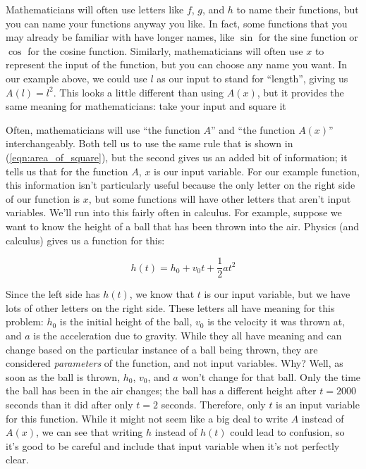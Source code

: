 Mathematicians will often use letters like $f$, $g$, and $h$ to name their functions, but you can name your functions anyway you like. In fact, some functions that you may already be familiar with have longer names, like $\sin$ for the sine function or $\cos$ for the cosine function. Similarly, mathematicians will often use $x$ to represent the input of the function, but you can choose any name you want. In our example above, we could use $l$ as our input to stand for ``length'', giving us $A(l) = l^2$. This looks a little different than using $A(x)$, but it provides the same meaning for mathematicians: take your input and square it

Often, mathematicians will use ``the function $A$'' and ``the function $A(x)$'' interchangeably. Both tell us to use the same rule that is shown in (\ref{eqn:area_of_square}), but the second gives us an added bit of information; it tells us that for the function $A$, $x$ is our input variable. For our example function, this information isn't particularly useful because the only letter on the right side of our function is $x$, but some functions will have other letters that aren't input variables. We'll run into this fairly often in calculus. For example, suppose we want to know the height of a ball that has been thrown into the air. Physics (and calculus) gives us a function for this:

\begin{equation}\label{eqn:height_of_ball}
	h(t)=h_0+v_0 t +\frac{1}{2}a t^2
\end{equation}

Since the left side has $h(t)$, we know that $t$ is our input variable, but we have lots of other letters on the right side. These letters all have meaning for this problem: $h_0$ is the initial height of the ball, $v_0$ is the velocity it was thrown at, and $a$ is the acceleration due to gravity. While they all have meaning and can change based on the particular instance of a ball being thrown, they are considered \emph{parameters} of the function, and not input variables. Why? Well, as soon as the ball is thrown, $h_0$, $v_0$, and $a$ won't change for that ball. Only the time the ball has been in the air changes; the ball has a different height after $t=2000$ seconds than it did after only $t=2$ seconds. Therefore, only $t$ is an input variable for this function. While it might not seem like a big deal to write $A$ instead of $A(x)$, we can see that writing $h$ instead of $h(t)$ could lead to confusion, so it's good to be careful and include that input variable when it's not perfectly clear.


